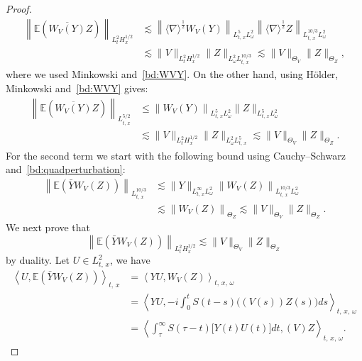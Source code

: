 \documentclass[10pt]{amsart}
\theoremstyle{definition}\newtheorem{defi}[theo]{Definition}\newtheorem{rema}[theo]{Remark}\newtheorem{exam}[theo]{Example}\newtheorem{exem}[theo]{Example}\newtheorem{nota}[theo]{Notation}
\newcommand{\E}{\mathbb{E}}
\begin{document}
\begin{proof}
\begin{equation}\label{bd:Q1inter1}
\begin{split}
\left\| \E \left(\overline{W_V(Y)} Z\right) \right\|_{L^2_{t}H^{1/2}_x} &\lesssim \left\| \langle \nabla \rangle^{\frac 12} W_V(Y) \right\|_{L^5_{t,\,x} L^2_\omega}\left\| \langle \nabla \rangle^{\frac 12} Z \right\|_{L^{10/3}_{t,\,x} L^2_\omega}\\
&\lesssim \|V\|_{L^2_tH^{1/2}_x} \| Z \|_{ L^2_\omega L^{10/3}_{t,\,x}}\lesssim \| V \|_{\Theta_V}\| Z\|_{\Theta_Z},
\end{split}
\end{equation}
where we used Minkowski and~\eqref{bd:WVY}. On the other hand, using H\"older, Minkowski and~\eqref{bd:WVY} gives:
\begin{equation} \label{bd:Q1inter2}
\begin{split}
\left\| \E \left(\overline{W_V(Y)} Z\right) \right\|_{L^{5/2}_{t,\,x}} &\leq \left\|W_V(Y)\right\|_{L^5_{t,\,x} L^2_\omega} \|Z\|_{L^{5}_{t,\,x} L^2_\omega}\\
&\lesssim \| V \|_{L^2_tH^{1/2}_x}\| Z \|_{L^2_\omega L^{5}_{t,\,x}} \lesssim \| V \|_{\Theta_V}\| Z \|_{\Theta_Z}.
\end{split}
\end{equation}
For the second term we start with the following bound using Cauchy--Schwarz and~\eqref{bd:quadperturbation}:
\begin{equation} \label{bd:L103inter}
\begin{split}
\left\| \E\left(\bar Y W_V(Z)\right)\right\|_{L^{10/3}_{t,\,x}} &\lesssim \|Y\|_{L^\infty_{t,\,x} L^2_\omega} \left\|W_V(Z)\right\|_{L^{10/3}_{t,\,x} L^2_\omega}\\
&\lesssim \left\| W_V(Z)\right\|_{\Theta_{Z}}\lesssim \| V\|_{\Theta_{V}}\| Z\|_{\Theta_{Z}}.
\end{split}
\end{equation}
We next prove that
\begin{equation} \label{bd:L2dualityinter}
\left\| \E\left(\bar Y W_V(Z)\right)\right\|_{L^2_t H^{1/2}_{x}} \lesssim \|V\|_{\Theta_V} \|Z\|_{\Theta_Z}
\end{equation}
by duality. Let $U \in L^2_{t,\,x}$, we have
\begin{align*}
\left\langle U, \E \left(\bar Y W_V(Z)\right)\right\rangle_{t,\,x} 
&=\left\langle YU,W_V(Z)\right\rangle_{t,\,x,\,\omega}\\
&=\left\langle YU,-i\int_0^t S(t-s)\big((V(s))Z(s)\big)ds\right\rangle_{t,\,x,\,\omega}\\
&= \left\langle\int_{\tau}^\infty S(\tau - t)\big[Y(t)U(t)\big]dt,(V) Z\right\rangle_{t,\,x,\,\omega}.
\end{align*}


\end{proof}
\end{document}
